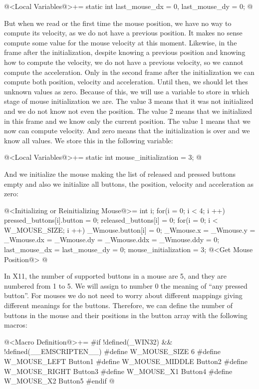 \iniciocodigo
@<Local Variables@>+=
static int last_mouse_dx = 0, last_mouse_dy = 0;
@
\fimcodigo

But when we read or the first time the mouse position, we have no way
to compute its velocity, as we do not have a previous position. It
makes no sense compute some value for the mouse velocity at this
moment. Likewise, in the frame after the initialization, despite
knowing a previous position and knowing how to compute the velocity,
we do not have a previous velocity, so we cannot compute the
acceleration. Only in the second frame after the initialization we can
compute both position, velocity and acceleration. Until then, we
should let thes unknown values as zero. Because of this, we will use a
variable to store in which stage of mouse initialization we are. The
value 3 means that it was not initialized and we do not know not even
the position. The value 2 means that we initialized in this frame and
we know only the current position. The value 1 means that we now can
compute velocity. And zero means that the initialization is over and
we know all values. We store this in the following variable:

\iniciocodigo
@<Local Variables@>+=
static int mouse_initialization = 3;
@
\fimcodigo


And we initialize the mouse making the list of released and pressed
buttons empty and also we initialize all buttons, the position,
velocity and acceleration as zero:

\iniciocodigo
@<Initializing or Reinitializing Mouse@>=
{
  int i;
  for(i = 0; i < 4; i ++){
    pressed_buttons[i].button = 0;
    released_buttons[i] = 0;
  }
  for(i = 0; i < W_MOUSE_SIZE; i ++)
    _Wmouse.button[i] = 0;
  _Wmouse.x = _Wmouse.y = _Wmouse.dx = _Wmouse.dy = _Wmouse.ddx = _Wmouse.ddy = 0;
  last_mouse_dx = last_mouse_dy = 0;
  mouse_initialization = 3;
  @<Get Mouse Position@>
}
@
\fimcodigo


In X11, the number of supported buttons in a mouse are 5, and they are
numbered from 1 to 5. We will assign to number 0 the meaning of ``any
pressed button''. For mouses we do not need to worry about different
mappings giving different meanings for the buttons. Therefore, we can
define the number of buttons in the mouse and their positions in the
button array with the following macros:

\iniciocodigo
@<Macro Definition@>+=
#if !defined(_WIN32) && !defined(__EMSCRIPTEN__)
#define W_MOUSE_SIZE 6
#define W_MOUSE_LEFT   Button1
#define W_MOUSE_MIDDLE Button2
#define W_MOUSE_RIGHT  Button3
#define W_MOUSE_X1     Button4
#define W_MOUSE_X2     Button5
#endif
@
\fimcodigo

